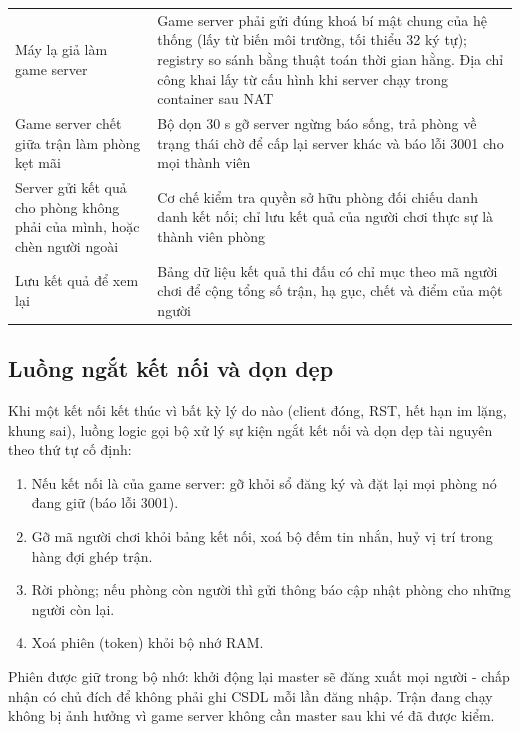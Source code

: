 \begin{center}\small
\begin{tabularx}{\linewidth}{|L{4.3cm}|Y|}
\hline
{} &  \\ \hline
Máy lạ giả làm game server & Game server phải gửi đúng khoá bí mật chung của hệ thống (lấy từ biến môi trường, tối thiểu 32 ký tự); registry so sánh bằng thuật toán thời gian hằng. Địa chỉ công khai lấy từ cấu hình khi server chạy trong container sau NAT \\ \hline
Game server chết giữa trận làm phòng kẹt mãi & Bộ dọn 30 s gỡ server ngừng báo sống, trả phòng về trạng thái chờ để cấp lại server khác và báo lỗi 3001 cho mọi thành viên \\ \hline
Server gửi kết quả cho phòng không phải của mình, hoặc chèn người ngoài & Cơ chế kiểm tra quyền sở hữu phòng đối chiếu danh danh kết nối; chỉ lưu kết quả của người chơi thực sự là thành viên phòng \\ \hline
Lưu kết quả để xem lại & Bảng dữ liệu kết quả thi đấu có chỉ mục theo mã người chơi để cộng tổng số trận, hạ gục, chết và điểm của một người \\ \hline
\end{tabularx}
\end{center}

\subsection{Luồng ngắt kết nối và dọn dẹp}
Khi một kết nối kết thúc vì bất kỳ lý do nào (client đóng, RST, hết hạn im lặng, khung sai), luồng logic gọi
bộ xử lý sự kiện ngắt kết nối và dọn dẹp tài nguyên theo thứ tự cố định:
\begin{enumerate}
  \item Nếu kết nối là của game server: gỡ khỏi sổ đăng ký và đặt lại mọi phòng nó đang giữ (báo lỗi 3001).
  \item Gỡ mã người chơi khỏi bảng kết nối, xoá bộ đếm tin nhắn, huỷ vị trí trong hàng đợi ghép trận.
  \item Rời phòng; nếu phòng còn người thì gửi thông báo cập nhật phòng cho những người còn lại.
  \item Xoá phiên (token) khỏi bộ nhớ RAM.
\end{enumerate}
Phiên được giữ trong bộ nhớ: khởi động lại master sẽ đăng xuất mọi người - chấp nhận có chủ đích để không phải ghi CSDL
mỗi lần đăng nhập. Trận đang chạy không bị ảnh hưởng vì game server không cần master sau khi vé đã được kiểm.

